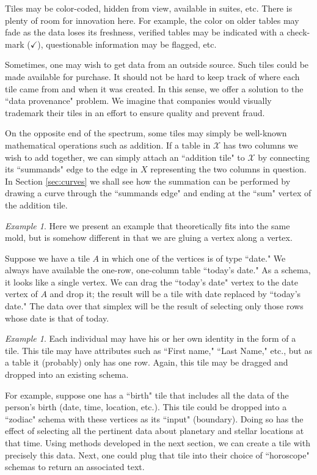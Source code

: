 \documentclass{amsart}
\def\mc{\mathcal}
\def\mcX{\mc{X}}
\theoremstyle{remark}
\newtheorem{example}[theorem]{Example}
\theoremstyle{definition}
\begin{document}
Tiles may be color-coded, hidden from view, available in suites, etc.  There is plenty of room for innovation here.  For example, the color on older tables may fade as the data loses its freshness, verified tables may be indicated with a check-mark ($\checkmark$), questionable information may be flagged, etc.

Sometimes, one may wish to get data from an outside source.   Such tiles could be made available for purchase.  It should not be hard to keep track of where each tile came from and when it was created.  In this sense, we offer a solution to the ``data provenance" problem.  We imagine that companies would visually trademark their tiles in an effort to ensure quality and prevent fraud.  

On the opposite end of the spectrum, some tiles may simply be well-known mathematical operations such as addition.  If a table in $\mcX$ has two columns we wish to add together, we can simply attach an ``addition tile" to $\mcX$ by connecting its ``summands" edge to the edge in $X$ representing the two columns in question.  In Section \ref{sec:curves} we shall see how the summation can be performed by drawing a curve through the ``summands edge" and ending at the ``sum" vertex of the addition tile.  

\begin{example}

Here we present an example that theoretically fits into the same mold, but is somehow different in that we are gluing a vertex along a vertex.  

Suppose we have a tile $A$ in which one of the vertices is of type ``date."  We always have available the one-row, one-column table ``today's date."  As a schema, it looks like a single vertex.  We can drag the ``today's date"  vertex to the date vertex of $A$ and drop it; the result will be a tile with date replaced by ``today's date."  The data over that simplex will be the result of selecting only those rows whose date is that of today.

\end{example}

\begin{example}

Each individual may have his or her own identity in the form of a tile.  This tile may have attributes such as ``First name," ``Last Name," etc., but as a table it (probably) only has one row.  Again, this tile may be dragged and dropped into an existing schema.

For example, suppose one has a ``birth" tile that includes all the data of the person's birth (date, time, location, etc.).  This tile could be dropped into a ``zodiac" schema with these vertices as its ``input" (boundary).  Doing so has the effect of selecting all the pertinent data about planetary and stellar locations at that time.  Using methods developed in the next section, we can create a tile with precisely this data.  Next, one could plug that tile into their choice of ``horoscope" schemas to return an associated text. 

\end{example}
\end{document}
